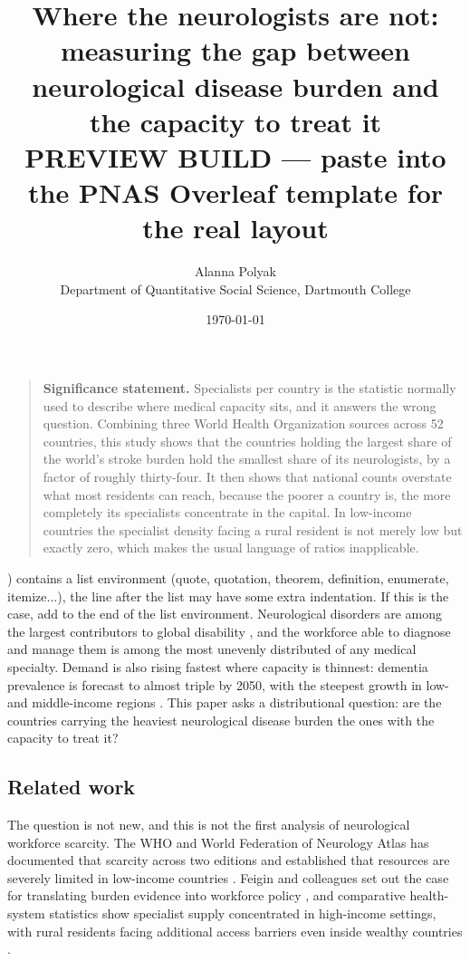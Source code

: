 \documentclass[10pt]{article}
\title{\vspace{-2.2em}Where the neurologists are not: measuring the gap between neurological disease burden and the capacity to treat it\\[0.4em]
\large PREVIEW BUILD --- paste into the PNAS Overleaf template for the real layout}
\author{Alanna Polyak \\ \small Department of Quantitative Social Science, Dartmouth College}
\date{\today}
\newcommand{\dropcap}[1]{#1}
\begin{document}
\maketitle

\begin{quote}\small\textbf{Significance statement.} Specialists per country is the statistic normally used to describe where medical capacity sits, and it answers the wrong question. Combining three World Health Organization sources across 52 countries, this study shows that the countries holding the largest share of the world's stroke burden hold the smallest share of its neurologists, by a factor of roughly thirty-four. It then shows that national counts overstate what most residents can reach, because the poorer a country is, the more completely its specialists concentrate in the capital. In low-income countries the specialist density facing a rural resident is not merely low but exactly zero, which makes the usual language of ratios inapplicable.\end{quote}

\dropcap) contains a list environment (quote, quotation, theorem, definition, enumerate, itemize...), the line after the list may have some extra indentation. If this is the case, add  to the end of the list environment.
\dropcap{N}eurological disorders are among the largest contributors to global
disability \cite{feigin2020}, and the workforce able to diagnose and manage them
is among the most unevenly distributed of any medical specialty. Demand is also
rising fastest where capacity is thinnest: dementia prevalence is forecast to
almost triple by 2050, with the steepest growth in low- and middle-income
regions \cite{gbd2022}. This paper asks a distributional question: are the
countries carrying the heaviest neurological disease burden the ones with the
capacity to treat it?


\subsection*{Related work}

The question is not new, and this is not the first analysis of neurological
workforce scarcity. The WHO and World Federation of Neurology Atlas has
documented that scarcity across two editions and established that resources are
severely limited in low-income countries \cite{atlas2017}. Feigin and colleagues
set out the case for translating burden evidence into workforce policy
\cite{feigin2020}, and comparative health-system statistics show specialist
supply concentrated in high-income settings, with rural residents facing
additional access barriers even inside wealthy countries \cite{oecd2023}.
\end{document}
